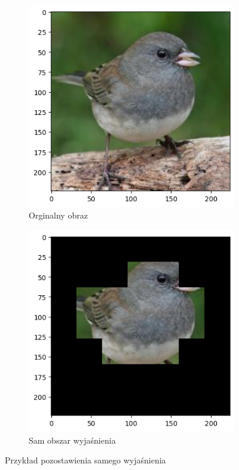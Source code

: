 \begin{figure}[h]
	\begin{subfigure}[b]{0.45\textwidth}
		\centering\includegraphics[width=.9\textwidth]{img/parameters/quality/base}
		\caption{Orginalny obraz}
	\end{subfigure}
	\begin{subfigure}[b]{0.45\textwidth}
		\centering\includegraphics[width=.9\textwidth]{img/parameters/quality/mask}
		\caption{Sam obszar wyjaśnienia}
	\end{subfigure}
	\caption{Przykład pozostawienia samego wyjaśnienia}
	\label{rys:example_only_exp}
\end{figure}

